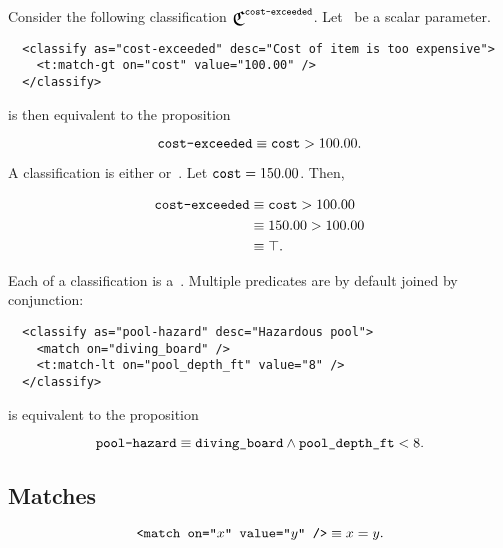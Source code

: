 Consider the following classification $\Classify^\texttt{cost-exceeded}$.
Let~ be a scalar parameter.

\begin{lstlisting}
  <classify as="cost-exceeded" desc="Cost of item is too expensive">
    <t:match-gt on="cost" value="100.00" />
  </classify>
\end{lstlisting}

\noindent
is then equivalent to the proposition

\begin{equation*}
  \texttt{cost-exceeded} \equiv \texttt{cost} > 100.00.
\end{equation*}

A classification is either \true or~\false.
Let $\texttt{cost}=150.00$.
Then,

\begin{align*}
  \texttt{cost-exceeded} & \equiv \texttt{cost} > 100.00 \\
                            & \equiv 150.00 > 100.00 \\
                            & \equiv \top.
\end{align*}

Each  of a classification is a~.
Multiple predicates are by default joined by conjunction:

\begin{lstlisting}
  <classify as="pool-hazard" desc="Hazardous pool">
    <match on="diving_board" />
    <t:match-lt on="pool_depth_ft" value="8" />
  </classify>
\end{lstlisting}

\noindent
is equivalent to the proposition

\begin{equation*}
  \texttt{pool-hazard} \equiv \texttt{diving\_board}
    \land \texttt{pool\_depth\_ft} < 8.
\end{equation*}


\subsection{Matches}
\begin{definition}
  \begin{equation*}
    \texttt{<match on="$x$" value="$y$" />} \equiv x = y.
  \end{equation*}
\end{definition}

